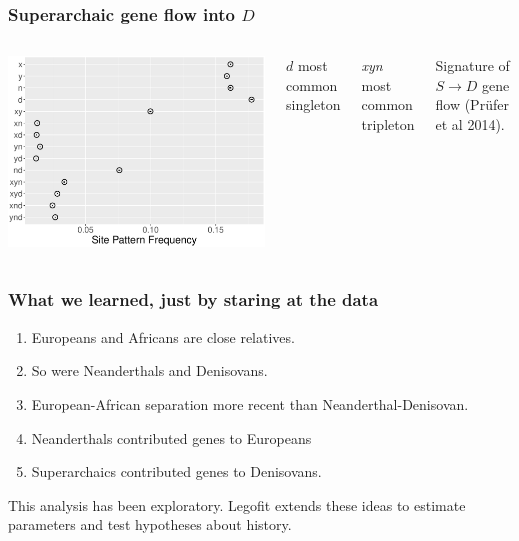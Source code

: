 \documentclass[pdftex,12pt]{beamer}
\begin{document}
\begin{frame}
  \frametitle{Superarchaic gene flow into $D$}
  \begin{columns}
    \includegraphics[width=\linewidth]{xynd-frq.pdf}
      \raggedleft

      $d$ most common singleton

      \bigskip

      \textit{xyn} most common tripleton

      \bigskip

      Signature of $S{\rightarrow}D$ gene flow (Pr{\"u}fer et al 2014).
  \end{columns}
\end{frame}

\begin{frame}
  \frametitle{What we learned, just by staring at the data}
  \begin{enumerate}
    \item Europeans and Africans are close relatives.
    \item So were Neanderthals and Denisovans.
    \item European-African separation more recent than
      Neanderthal-Denisovan.
    \item Neanderthals contributed genes to Europeans
    \item Superarchaics contributed genes to Denisovans.
  \end{enumerate}

  \bigskip
  
This analysis has been exploratory. Legofit extends these ideas to
estimate parameters and test hypotheses about history.
\end{frame}  
\end{document}
